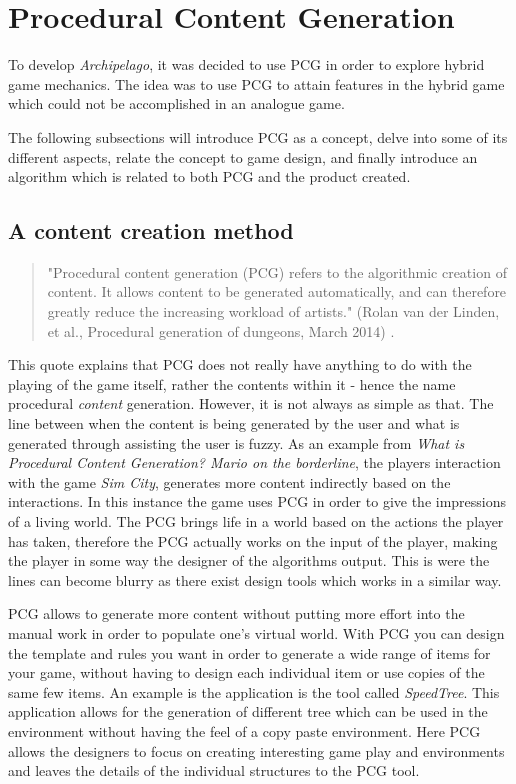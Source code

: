 \section{Procedural Content Generation}
To develop \textit{Archipelago}, it was decided to use PCG in order to explore hybrid game mechanics. The idea was to use PCG to attain features in the hybrid game which could not be accomplished in an analogue game.

The following subsections will introduce PCG as a concept, delve into some of its different aspects, relate the concept to game design, and finally introduce an algorithm which is related to both PCG and the product created.

\subsection{A content creation method}
\begin{quotation}
"Procedural content generation (PCG) refers to the algorithmic creation of content. It allows content to be generated automatically, and can therefore greatly reduce the increasing workload of artists." (Rolan van der Linden, et al., Procedural generation of dungeons, March 2014) \cite{art:pcg}. 
\end{quotation}
This quote explains that PCG does not really have anything to do with the playing of the game itself, rather the contents within it - hence the name procedural \textit{content} generation. 
However, it is not always as simple as that. The line between when the content is being generated by the user and what is generated through assisting the user is fuzzy.
As an example from \textit{What is Procedural Content Generation? Mario on the borderline}\cite{art:whatpcg}, the players interaction with the game \textit{Sim City}, generates more content indirectly based on the interactions.
In this instance the game uses PCG in order to give the impressions of a living world. The PCG brings life in a world based on the actions the player has taken, therefore the PCG actually works on the input of the player, making the player in some way the designer of the algorithms output. This is were the lines can become blurry as there exist design tools which works in a similar way. 

PCG allows to generate more content without putting more effort into the manual work in order to populate one's virtual world. With PCG you can design the template and rules you want in order to generate a wide range of items for your game, without having to design each individual item or use copies of the same few items. An example is the application is the tool called \textit{SpeedTree}. This application allows for the generation of different tree which can be used in the environment without having the feel of a copy paste environment. Here PCG allows the designers to focus on creating interesting game play and environments and leaves the details of the individual structures to the PCG tool. 

